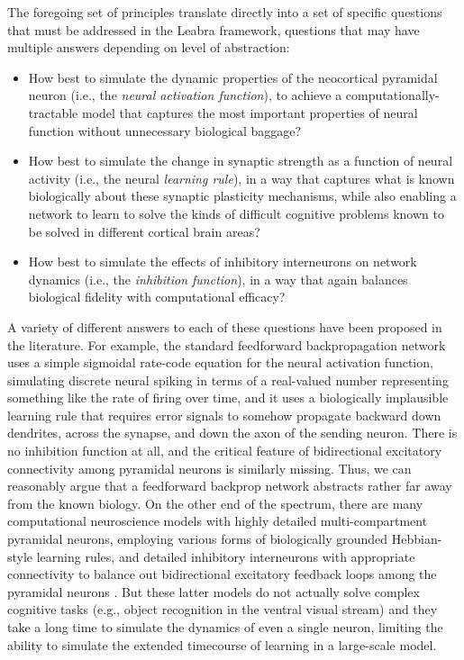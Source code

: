 \documentclass[11pt,twoside]{article}
\begin{document}
The foregoing set of principles translate directly into a set of specific
questions that must be addressed in the Leabra framework, questions that may
have multiple answers depending on level of abstraction:
\begin{itemize}
\item How best to simulate the dynamic properties of the neocortical pyramidal
  neuron (i.e., the {\em neural activation function}), to achieve a
  computationally-tractable model that captures the most important properties
  of neural function without unnecessary biological baggage?
\item How best to simulate the change in synaptic strength as a function of
  neural activity (i.e., the neural {\em learning rule}), in a way that
  captures what is known biologically about these synaptic plasticity
  mechanisms, while also enabling a network to learn to solve the kinds of
  difficult cognitive problems known to be solved in different cortical brain
  areas?
\item How best to simulate the effects of inhibitory interneurons on network
  dynamics (i.e., the {\em inhibition function}), in a way that again balances
  biological fidelity with computational efficacy?
\end{itemize}

A variety of different answers to each of these questions have been proposed
in the literature.  For example, the standard feedforward backpropagation
network uses a simple sigmoidal rate-code equation for the neural activation
function, simulating discrete neural spiking in terms of a real-valued number
representing something like the rate of firing over time, and it uses a
biologically implausible learning rule that requires error signals to somehow
propagate backward down dendrites, across the synapse, and down the axon of
the sending neuron.  There is no inhibition function at all, and the critical
feature of bidirectional excitatory connectivity among pyramidal neurons is
similarly missing.  Thus, we can reasonably argue that a feedforward backprop
network abstracts rather far away from the known biology.  On the other end of
the spectrum, there are many computational neuroscience models with highly
detailed multi-compartment pyramidal neurons, employing various forms of
biologically grounded Hebbian-style learning rules, and detailed inhibitory
interneurons with appropriate connectivity to balance out bidirectional
excitatory feedback loops among the pyramidal neurons
\cite[e.g.,]{Markram06,TraubMilesWong89,IzhikevichEdelman08}.  But these
latter models do not actually solve complex cognitive tasks (e.g., object
recognition in the ventral visual stream) and they take a long time to
simulate the dynamics of even a single neuron, limiting the ability to
simulate the extended timecourse of learning in a large-scale model.
\end{document}
